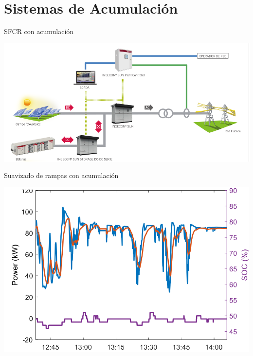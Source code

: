 \documentclass[aspectratio=169, usenames,svgnames,dvipsnames]{beamer}
\begin{document}
\section{Sistemas de Acumulación}
\label{sec:orgbe7335e}

\begin{frame}[label={sec:org28183a6}]{SFCR con acumulación}
\begin{center}
\includegraphics[width=\textwidth]{../figs/EsquemaSFCRAcumulacion.pdf}
\end{center}
\end{frame}

\begin{frame}[label={sec:org636f547}]{Suavizado de rampas con acumulación}
\begin{center}
\includegraphics[height=0.9\textheight]{../figs/SuavizadoRampasAcumulacion.png}
\end{center}
\end{frame}
\end{document}
